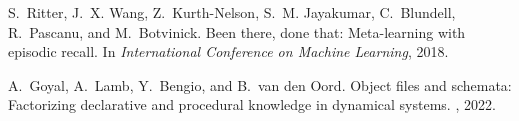 \begin{thebibliography}{20}
S.~Ritter, J.~X. Wang, Z.~Kurth-Nelson, S.~M. Jayakumar, C.~Blundell, R.~Pascanu, and M.~Botvinick.
\newblock Been there, done that: Meta-learning with episodic recall.
\newblock In {\em International Conference on Machine Learning}, 2018.

A.~Goyal, A.~Lamb, Y.~Bengio, and B.~van den Oord.
\newblock Object files and schemata: Factorizing declarative and procedural knowledge in dynamical systems.
, 2022.

\end{thebibliography}
